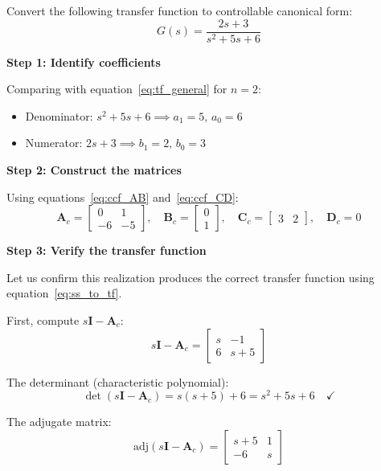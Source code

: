 \begin{example}
\label{ex:tf_to_ccf_2nd}
Convert the following transfer function to controllable canonical form:
\begin{equation}
G(s) = \frac{2s + 3}{s^2 + 5s + 6}
\end{equation}

\textbf{Step 1: Identify coefficients}

Comparing with equation~\eqref{eq:tf_general} for $n = 2$:
\begin{itemize}
    \item Denominator: $s^2 + 5s + 6 \implies a_1 = 5, \, a_0 = 6$
    \item Numerator: $2s + 3 \implies b_1 = 2, \, b_0 = 3$
\end{itemize}

\textbf{Step 2: Construct the matrices}

Using equations~\eqref{eq:ccf_AB} and~\eqref{eq:ccf_CD}:
\begin{equation}
\mathbf{A}_c = \begin{bmatrix} 0 & 1 \\ -6 & -5 \end{bmatrix}, \quad
\mathbf{B}_c = \begin{bmatrix} 0 \\ 1 \end{bmatrix}, \quad
\mathbf{C}_c = \begin{bmatrix} 3 & 2 \end{bmatrix}, \quad
\mathbf{D}_c = 0
\end{equation}

\textbf{Step 3: Verify the transfer function}

Let us confirm this realization produces the correct transfer function using equation~\eqref{eq:ss_to_tf}.

First, compute $s\mathbf{I} - \mathbf{A}_c$:
\begin{equation}
s\mathbf{I} - \mathbf{A}_c = \begin{bmatrix} s & -1 \\ 6 & s+5 \end{bmatrix}
\end{equation}

The determinant (characteristic polynomial):
\begin{equation}
\det(s\mathbf{I} - \mathbf{A}_c) = s(s+5) + 6 = s^2 + 5s + 6 \quad \checkmark
\end{equation}

The adjugate matrix:
\begin{equation}
\text{adj}(s\mathbf{I} - \mathbf{A}_c) = \begin{bmatrix} s+5 & 1 \\ -6 & s \end{bmatrix}
\end{equation}


\end{example}
